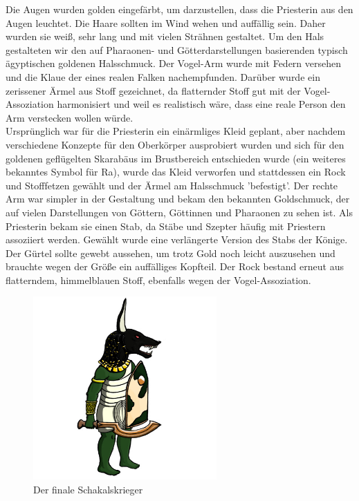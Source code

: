 \documentclass[extern,palatino]{cgBA}
\begin{document}
Die Augen wurden golden eingefärbt, um darzustellen, dass die Priesterin aus den Augen leuchtet. Die Haare sollten im Wind wehen und auffällig sein. Daher wurden sie weiß, sehr lang und mit vielen Strähnen gestaltet. Um den Hals gestalteten wir den auf Pharaonen- und Götterdarstellungen basierenden typisch ägyptischen goldenen Halsschmuck. Der Vogel-Arm wurde mit Federn versehen und die Klaue der eines realen Falken nachempfunden. Darüber wurde ein zerissener Ärmel aus Stoff gezeichnet, da flatternder Stoff gut mit der Vogel-Assoziation harmonisiert und weil es realistisch wäre, dass eine reale Person den Arm verstecken wollen würde.
\\Ursprünglich war für die Priesterin ein einärmliges Kleid geplant, aber nachdem verschiedene Konzepte für den Oberkörper ausprobiert wurden und sich für den goldenen geflügelten Skarabäus im Brustbereich entschieden wurde (ein weiteres bekanntes Symbol für Ra), wurde das Kleid verworfen und stattdessen ein Rock und Stofffetzen gewählt und der Ärmel am Halsschmuck 'befestigt'. Der rechte Arm war simpler in der Gestaltung und bekam den bekannten Goldschmuck, der auf vielen Darstellungen von Göttern, Göttinnen und Pharaonen zu sehen ist. Als Priesterin bekam sie einen Stab, da Stäbe und Szepter häufig mit Priestern assoziiert werden. Gewählt wurde eine verlängerte Version des Stabs der Könige. Der Gürtel sollte gewebt aussehen, um trotz Gold noch leicht auszusehen und brauchte wegen der Größe ein auffälliges Kopfteil. Der Rock bestand erneut aus flatterndem, himmelblauen Stoff, ebenfalls wegen der Vogel-Assoziation.

\newpage
\begin{figure}[H]
	\centering
	\includegraphics[height=7cm]{jackal.jpg}
	\caption{Der finale Schakalskrieger}
	\label{jackal}
\end{figure}
\end{document}
